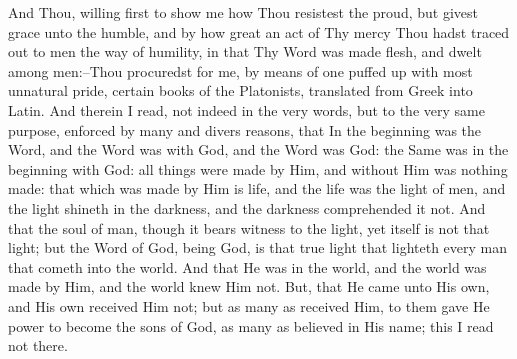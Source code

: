 \documentclass[b5paper,openright,12pt,twoside]{book}
\begin{document}
And Thou, willing first to show me how Thou resistest the proud, but
givest grace unto the humble, and by how great an act of Thy mercy Thou
hadst traced out to men the way of humility, in that Thy Word was made
flesh, and dwelt among men:--Thou procuredst for me, by means of one
puffed up with most unnatural pride, certain books of the Platonists,
translated from Greek into Latin. And therein I read, not indeed in the
very words, but to the very same purpose, enforced by many and divers
reasons, that In the beginning was the Word, and the Word was with God,
and the Word was God: the Same was in the beginning with God: all things
were made by Him, and without Him was nothing made: that which was made
by Him is life, and the life was the light of men, and the light shineth
in the darkness, and the darkness comprehended it not. And that the soul
of man, though it bears witness to the light, yet itself is not that
light; but the Word of God, being God, is that true light that lighteth
every man that cometh into the world. And that He was in the world, and
the world was made by Him, and the world knew Him not. But, that He came
unto His own, and His own received Him not; but as many as received Him,
to them gave He power to become the sons of God, as many as believed in
His name; this I read not there.
\end{document}
